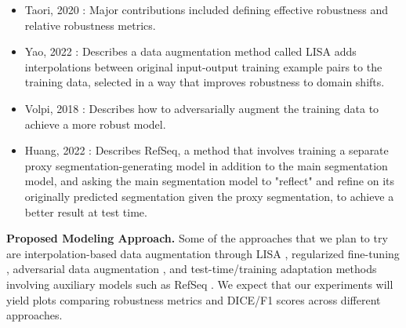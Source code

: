 \documentclass{article}
\begin{document}
\begin{itemize}
    \item Taori, 2020 \cite{Taori2020}: Major contributions included defining effective robustness and relative robustness metrics. 
    \item Yao, 2022 \cite{yao2022improving}: Describes a data augmentation method called LISA adds interpolations between original input-output training example pairs to the training data, selected in a way that improves robustness to domain shifts.
    \item Volpi, 2018 \cite{volpi2018generalizing}: Describes how to adversarially augment the training data to achieve a more robust model. 
    \item Huang, 2022 \cite{huang2022online}: Describes RefSeq, a method that involves training a separate proxy segmentation-generating model in addition to the main segmentation model, and asking the main segmentation model to "reflect" and refine on its originally predicted segmentation given the proxy segmentation, to achieve a better result at test time. 
\end{itemize}

\textbf{Proposed Modeling Approach.} 
Some of the approaches that we plan to try are interpolation-based data augmentation through LISA \cite{yao2022improving}, regularized fine-tuning \cite{li2021}, adversarial data augmentation \cite{volpi2018generalizing}, and test-time/training adaptation methods involving auxiliary models such as RefSeq \cite{huang2022online}. We expect that our experiments will yield plots comparing robustness metrics and DICE/F1 scores across different approaches.



\end{document}
